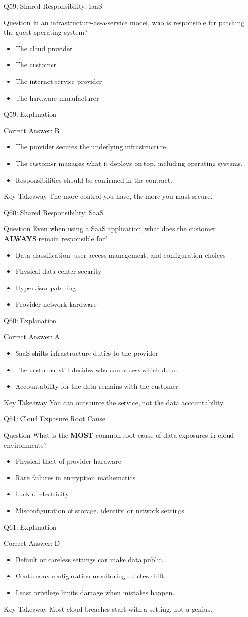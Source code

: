 \documentclass[aspectratio=169]{beamer}
\newcommand{\hq}[7]{%
	\begin{frame}{Q#1: #2}
		\begin{block}{Question}
			#3
		\end{block}
		\begin{itemize}
			#4
		\end{itemize}
	\end{frame}
	\begin{frame}{Q#1: Explanation}
		\begin{block}{Correct Answer: #5}
			\begin{itemize}
				#6
			\end{itemize}
		\end{block}
		\begin{alertblock}{Key Takeaway}
			#7
		\end{alertblock}
	\end{frame}
}
\begin{document}
	\hq{59}{Shared Responsibility: IaaS}
	{In an infrastructure-as-a-service model, who is responsible for patching the guest operating system?}
	{\item[\textbf{(A)}] The cloud provider
		\item[\textbf{(B)}] The customer
		\item[\textbf{(C)}] The internet service provider
		\item[\textbf{(D)}] The hardware manufacturer}
	{B}
	{\item The provider secures the underlying infrastructure.
		\item The customer manages what it deploys on top, including operating systems.
		\item Responsibilities should be confirmed in the contract.}
	{The more control you have, the more you must secure.}
	
	\hq{60}{Shared Responsibility: SaaS}
	{Even when using a SaaS application, what does the customer \textbf{ALWAYS} remain responsible for?}
	{\item[\textbf{(A)}] Data classification, user access management, and configuration choices
		\item[\textbf{(B)}] Physical data center security
		\item[\textbf{(C)}] Hypervisor patching
		\item[\textbf{(D)}] Provider network hardware}
	{A}
	{\item SaaS shifts infrastructure duties to the provider.
		\item The customer still decides who can access which data.
		\item Accountability for the data remains with the customer.}
	{You can outsource the service, not the data accountability.}
	
	\hq{61}{Cloud Exposure Root Cause}
	{What is the \textbf{MOST} common root cause of data exposures in cloud environments?}
	{\item[\textbf{(A)}] Physical theft of provider hardware
		\item[\textbf{(B)}] Rare failures in encryption mathematics
		\item[\textbf{(C)}] Lack of electricity
		\item[\textbf{(D)}] Misconfiguration of storage, identity, or network settings}
	{D}
	{\item Default or careless settings can make data public.
		\item Continuous configuration monitoring catches drift.
		\item Least privilege limits damage when mistakes happen.}
	{Most cloud breaches start with a setting, not a genius.}
	
\end{document}
